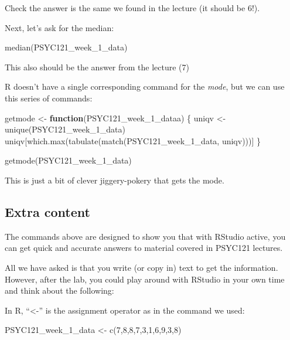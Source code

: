 \documentclass[
]{book}
\newenvironment{Shaded}{\begin{snugshade}}{\end{snugshade}}
\newcommand{\ControlFlowTok}[1]{\textcolor[rgb]{0.13,0.29,0.53}{\textbf{#1}}}
\newcommand{\DecValTok}[1]{\textcolor[rgb]{0.00,0.00,0.81}{#1}}
\newcommand{\FunctionTok}[1]{\textcolor[rgb]{0.00,0.00,0.00}{#1}}
\newcommand{\NormalTok}[1]{#1}
\newcommand{\OtherTok}[1]{\textcolor[rgb]{0.56,0.35,0.01}{#1}}
\begin{document}
Check the answer is the same we found in the lecture (it should be 6!).

Next, let's ask for the median:

\begin{Shaded}
\begin{Highlighting}[]
\FunctionTok{median}\NormalTok{(PSYC121\_week\_1\_data)}
\end{Highlighting}
\end{Shaded}

This also should be the answer from the lecture (7)

R doesn't have a single corresponding command for the \emph{mode}, but we can use this series of commands:

\begin{Shaded}
\begin{Highlighting}[]
\NormalTok{getmode }\OtherTok{\textless{}{-}} 
  \ControlFlowTok{function}\NormalTok{(PSYC121\_week\_1\_dataa) \{}
\NormalTok{    uniqv }\OtherTok{\textless{}{-}} \FunctionTok{unique}\NormalTok{(PSYC121\_week\_1\_data)}
\NormalTok{    uniqv[}\FunctionTok{which.max}\NormalTok{(}\FunctionTok{tabulate}\NormalTok{(}\FunctionTok{match}\NormalTok{(PSYC121\_week\_1\_data, uniqv)))]}
\NormalTok{    \}}

\FunctionTok{getmode}\NormalTok{(PSYC121\_week\_1\_data)}
\end{Highlighting}
\end{Shaded}

This is just a bit of clever jiggery-pokery that gets the mode.

\hypertarget{extra-content}{%
\subsection{Extra content}\label{extra-content}}

The commands above are designed to show you that with RStudio active, you can get quick and accurate answers to material covered in PSYC121 lectures.

All we have asked is that you write (or copy in) text to get the information. However, after the lab, you could play around with RStudio in your own time and think about the following:

In R, ``\textless-'' is the assignment operator as in the command we used:

\begin{Shaded}
\begin{Highlighting}[]
\NormalTok{PSYC121\_week\_1\_data }\OtherTok{\textless{}{-}} \FunctionTok{c}\NormalTok{(}\DecValTok{7}\NormalTok{,}\DecValTok{8}\NormalTok{,}\DecValTok{8}\NormalTok{,}\DecValTok{7}\NormalTok{,}\DecValTok{3}\NormalTok{,}\DecValTok{1}\NormalTok{,}\DecValTok{6}\NormalTok{,}\DecValTok{9}\NormalTok{,}\DecValTok{3}\NormalTok{,}\DecValTok{8}\NormalTok{)}
\end{Highlighting}
\end{Shaded}
\end{document}
